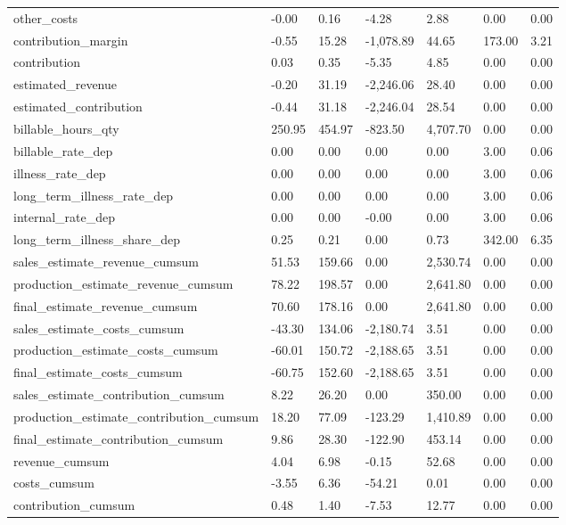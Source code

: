 \begin{landscape}
\begin{longtable}[h!]{lllllll}
other_costs & -0.00 & 0.16 & -4.28 & 2.88 & 0.00 & 0.00 \\
contribution_margin & -0.55 & 15.28 & -1,078.89 & 44.65 & 173.00 & 3.21 \\
contribution & 0.03 & 0.35 & -5.35 & 4.85 & 0.00 & 0.00 \\
estimated_revenue & -0.20 & 31.19 & -2,246.06 & 28.40 & 0.00 & 0.00 \\
estimated_contribution & -0.44 & 31.18 & -2,246.04 & 28.54 & 0.00 & 0.00 \\
billable_hours_qty & 250.95 & 454.97 & -823.50 & 4,707.70 & 0.00 & 0.00 \\
billable_rate_dep & 0.00 & 0.00 & 0.00 & 0.00 & 3.00 & 0.06 \\
illness_rate_dep & 0.00 & 0.00 & 0.00 & 0.00 & 3.00 & 0.06 \\
long_term_illness_rate_dep & 0.00 & 0.00 & 0.00 & 0.00 & 3.00 & 0.06 \\
internal_rate_dep & 0.00 & 0.00 & -0.00 & 0.00 & 3.00 & 0.06 \\
long_term_illness_share_dep & 0.25 & 0.21 & 0.00 & 0.73 & 342.00 & 6.35 \\
sales_estimate_revenue_cumsum & 51.53 & 159.66 & 0.00 & 2,530.74 & 0.00 & 0.00 \\
production_estimate_revenue_cumsum & 78.22 & 198.57 & 0.00 & 2,641.80 & 0.00 & 0.00 \\
final_estimate_revenue_cumsum & 70.60 & 178.16 & 0.00 & 2,641.80 & 0.00 & 0.00 \\
sales_estimate_costs_cumsum & -43.30 & 134.06 & -2,180.74 & 3.51 & 0.00 & 0.00 \\
production_estimate_costs_cumsum & -60.01 & 150.72 & -2,188.65 & 3.51 & 0.00 & 0.00 \\
final_estimate_costs_cumsum & -60.75 & 152.60 & -2,188.65 & 3.51 & 0.00 & 0.00 \\
sales_estimate_contribution_cumsum & 8.22 & 26.20 & 0.00 & 350.00 & 0.00 & 0.00 \\
production_estimate_contribution_cumsum & 18.20 & 77.09 & -123.29 & 1,410.89 & 0.00 & 0.00 \\
final_estimate_contribution_cumsum & 9.86 & 28.30 & -122.90 & 453.14 & 0.00 & 0.00 \\
revenue_cumsum & 4.04 & 6.98 & -0.15 & 52.68 & 0.00 & 0.00 \\
costs_cumsum & -3.55 & 6.36 & -54.21 & 0.01 & 0.00 & 0.00 \\
contribution_cumsum & 0.48 & 1.40 & -7.53 & 12.77 & 0.00 & 0.00 \\

\end{longtable}
\end{landscape}
